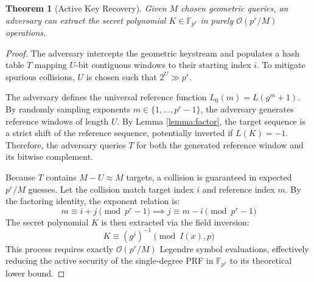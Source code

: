 \documentclass[10pt,a4paper]{amsart}
\newtheorem{theorem}{Theorem}
\begin{document}
\begin{theorem}[Active Key Recovery] \label{thm:active}
Given $M$ chosen geometric queries, an adversary can extract the secret polynomial $K \in \mathbb{F}_{p^r}$ in purely $\mathcal{O}(p^r / M)$ operations.
\end{theorem}

\begin{proof}
The adversary intercepts the geometric keystream and populates a hash table $T$ mapping $U$-bit contiguous windows to their starting index $i$. To mitigate spurious collisions, $U$ is chosen such that $2^U \gg p^r$.

The adversary defines the universal reference function $L_0(m) = L(g^m + 1)$. By randomly sampling exponents $m \in \{1, \dots, p^r-1\}$, the adversary generates reference windows of length $U$. By Lemma \ref{lemma:factor}, the target sequence is a strict shift of the reference sequence, potentially inverted if $L(K) = -1$. Therefore, the adversary queries $T$ for both the generated reference window and its bitwise complement.

Because $T$ contains $M - U \approx M$ targets, a collision is guaranteed in expected $p^r/M$ guesses. Let the collision match target index $i$ and reference index $m$. By the factoring identity, the exponent relation is:
\begin{equation*}
    m \equiv i + j \pmod{p^r - 1} \implies j \equiv m - i \pmod{p^r - 1}
\end{equation*}
The secret polynomial $K$ is then extracted via the field inversion:
\begin{equation*}
    K \equiv (g^j)^{-1} \pmod{I(x), p}
\end{equation*}
This process requires exactly $\mathcal{O}(p^r/M)$ Legendre symbol evaluations, effectively reducing the active security of the single-degree PRF in $\mathbb{F}_{p^r}$ to its theoretical lower bound.
\end{proof}
\end{document}
